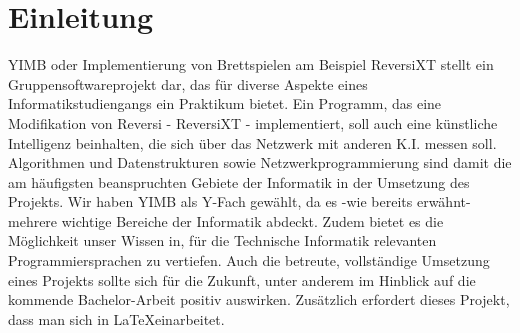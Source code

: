 \documentclass[12pt,a4paper]{article}
\begin{document}
\section{Einleitung}
YIMB oder \glqq Implementierung von Brettspielen am Beispiel ReversiXT\grqq{} stellt ein Gruppensoftwareprojekt dar, das für diverse Aspekte eines 
Informatikstudiengangs ein Praktikum bietet. Ein Programm, das eine Modifikation von Reversi - ReversiXT - implementiert, soll auch eine künstliche 
Intelligenz beinhalten, die sich über das Netzwerk mit anderen K.I. messen soll. Algorithmen und Datenstrukturen sowie Netzwerkprogrammierung sind 
damit die am häufigsten beanspruchten Gebiete der Informatik in der Umsetzung des Projekts.\newline
Wir haben YIMB als Y-Fach gewählt, da es -wie bereits erwähnt- mehrere wichtige Bereiche der Informatik abdeckt. Zudem bietet es die Möglichkeit unser Wissen in, für die Technische Informatik relevanten Programmiersprachen zu vertiefen. Auch die betreute, vollständige Umsetzung eines Projekts sollte sich für die Zukunft, unter anderem im Hinblick auf die kommende Bachelor-Arbeit positiv auswirken. Zusätzlich erfordert dieses Projekt, dass man sich in \glqq LaTeX\grqq einarbeitet.
\end{document}
